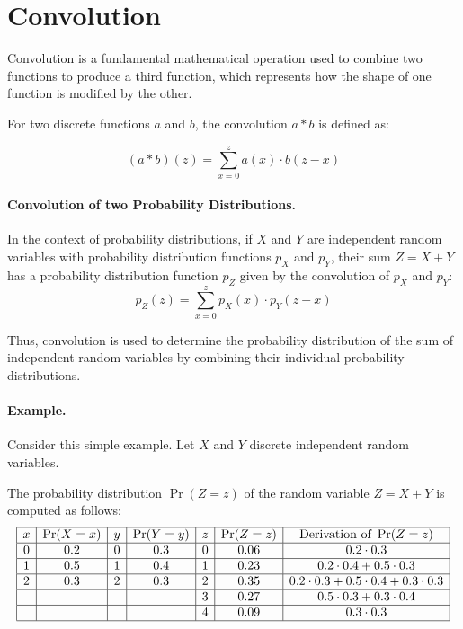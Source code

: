 \documentclass{masterthesis}
\begin{document}
\section{Convolution}

Convolution is a fundamental mathematical operation used to combine two functions to produce a third function, which represents how the shape of one function is modified by the other. 

For two discrete functions \(a\) and \(b\), the convolution \(a * b\) is defined as:

\begin{equation}
    (a * b)(z) = \sum_{x=0}^{z} a(x) \cdot b(z - x)
\end{equation}

\paragraph*{Convolution of two Probability Distributions.}
In the context of probability distributions, if \(X\) and \(Y\) are independent random variables with probability distribution functions \(p_X\) and \(p_Y\), their sum \(Z = X + Y\) has a probability distribution function \(p_Z\) given by the convolution of \(p_X\) and \(p_Y\):
\begin{equation}\label{eq:convolution}
    p_Z(z) = \sum_{x=0}^{z} p_X(x) \cdot p_Y(z - x)
\end{equation}

Thus, convolution is used to determine the probability distribution of the sum of independent random variables by combining their individual probability distributions.

\paragraph*{Example.} 

Consider this simple example. Let $X$ and $Y$ discrete independent random variables. 

The probability distribution $\Pr(Z = z)$ of the random variable $Z = X + Y$ is computed as follows:
\begin{equation*}\label{eq:convolution_example}
    \begin{array}{|c|c|c|c|c|c|c|}
        \hline
        x & \Pr(X = x) & y & \Pr(Y = y) & z & \Pr(Z = z) & \text{Derivation of }\Pr(Z = z)\\
        \hline
        0 & 0.2 & 0 & 0.3 & 0 & 0.06 & 0.2 \cdot 0.3 \\
        \hline
        1 & 0.5 & 1 & 0.4 & 1 & 0.23 & 0.2 \cdot 0.4 + 0.5 \cdot 0.3 \\
        \hline
        2 & 0.3 & 2 & 0.3 & 2 & 0.35 & 0.2 \cdot 0.3 + 0.5 \cdot 0.4 + 0.3 \cdot 0.3 \\
        \hline
         &  &  &  & 3 & 0.27 & 0.5 \cdot 0.3 + 0.3 \cdot 0.4 \\
        \hline
         &  &  &  & 4 & 0.09 & 0.3 \cdot 0.3 \\
        \hline
    \end{array}
\end{equation*}
\end{document}
